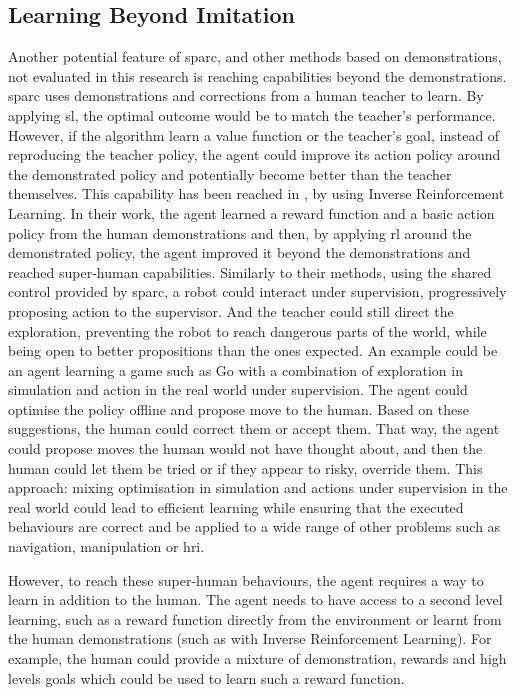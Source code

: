 \subsection{Learning Beyond Imitation}
Another potential feature of \gls{sparc}, and other methods based on demonstrations, not evaluated in this research is reaching capabilities beyond the demonstrations. \gls{sparc} uses demonstrations and corrections from a human teacher to learn. By applying \gls{sl}, the optimal outcome would be to match the teacher's performance. However, if the algorithm learn a value function or the teacher's goal, instead of reproducing the teacher policy, the agent could improve its action policy around the demonstrated policy and potentially become better than the teacher themselves. This capability has been reached in \cite{abbeel2004apprenticeship}, by using Inverse Reinforcement Learning. In their work, the agent learned a reward function and a basic action policy from the human demonstrations and then, by applying \gls{rl} around the demonstrated policy, the agent improved it beyond the demonstrations and reached super-human capabilities. Similarly to their methods, using the shared control provided by \gls{sparc}, a robot could interact under supervision, progressively proposing action to the supervisor. And the teacher could still direct the exploration, preventing the robot to reach dangerous parts of the world, while being open to better propositions than the ones expected. An example could be an agent learning a game such as Go with a combination of exploration in simulation and action in the real world under supervision. The agent could optimise the policy offline and propose move to the human. Based on these suggestions, the human could correct them or accept them. That way, the agent could propose moves the human would not have thought about, and then the human could let them be tried or if they appear to risky, override them. This approach: mixing optimisation in simulation and actions under supervision in the real world could lead to efficient learning while ensuring that the executed behaviours are correct and be applied to a wide range of other problems such as navigation, manipulation or \gls{hri}. %

However, to reach these super-human behaviours, the agent requires a way to learn in addition to the human. The agent needs to have access to a second level learning, such as a reward function directly from the environment or learnt from the human demonstrations (such as with Inverse Reinforcement Learning). For example, the human could provide a mixture of demonstration, rewards and high levels goals which could be used to learn such a reward function.

